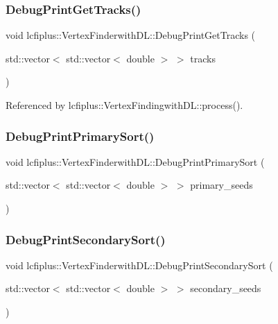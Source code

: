 \mbox{\label{namespacelcfiplus_1_1VertexFinderwithDL_a20069cf25a193bc90c3b406b9722d31e}} 
\subsubsection{Debug\+Print\+Get\+Tracks()}
{\footnotesize\ttfamily void lcfiplus\+::\+Vertex\+Finderwith\+D\+L\+::\+Debug\+Print\+Get\+Tracks (\begin{DoxyParamCaption}\item[{std\+::vector$<$ std\+::vector$<$ double $>$ $>$}]{tracks }\end{DoxyParamCaption})}



Referenced by lcfiplus\+::\+Vertex\+Findingwith\+D\+L\+::process().

\mbox{\label{namespacelcfiplus_1_1VertexFinderwithDL_a2ab0b048939212519481d2fe77644a54}} 
\subsubsection{Debug\+Print\+Primary\+Sort()}
{\footnotesize\ttfamily void lcfiplus\+::\+Vertex\+Finderwith\+D\+L\+::\+Debug\+Print\+Primary\+Sort (\begin{DoxyParamCaption}\item[{std\+::vector$<$ std\+::vector$<$ double $>$ $>$}]{primary\+\_\+seeds }\end{DoxyParamCaption})}

\mbox{\label{namespacelcfiplus_1_1VertexFinderwithDL_a562c9053b9fe8d261d9ff3c9f9cc40f0}} 
\subsubsection{Debug\+Print\+Secondary\+Sort()}
{\footnotesize\ttfamily void lcfiplus\+::\+Vertex\+Finderwith\+D\+L\+::\+Debug\+Print\+Secondary\+Sort (\begin{DoxyParamCaption}\item[{std\+::vector$<$ std\+::vector$<$ double $>$ $>$}]{secondary\+\_\+seeds }\end{DoxyParamCaption})}



